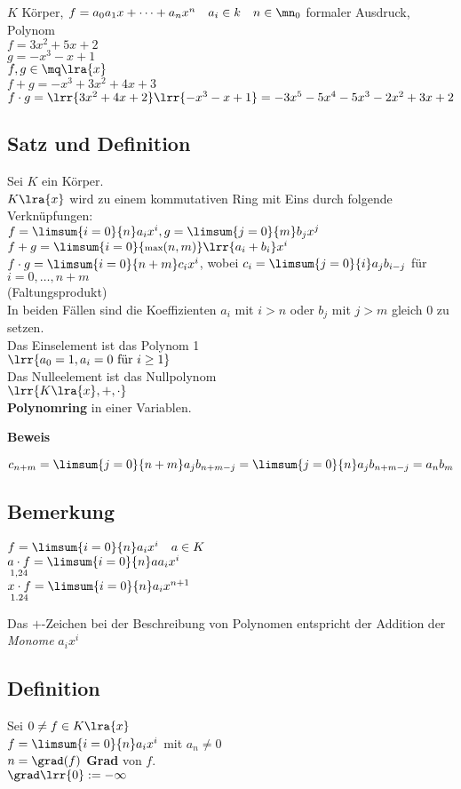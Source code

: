 	$K$ Körper, $f=a_0a_1x+\dots+a_nx^n\quad a_i\in k\quad n\in\mn_0$ formaler Ausdruck, Polynom\\
	$f=3x^2+5x+2$\\
	$g=-x^3-x+1$\\
	$f,g\in\mq\lra{x}$\\
	$f+g=-x^3+3x^2+4x+3$\\
	$f\cdot g=\lrr{3x^2+4x+2}\lrr{-x^3-x+1}=-3x^5-5x^4-5x^3-2x^2+3x+2$
\subsection{Satz und Definition}
	Sei $K$ ein Körper.\\
	$K\lra{x}$ wird zu einem kommutativen Ring mit Eins durch folgende Verknüpfungen:\\
	$f=\limsum{i=0}{n}a_ix^i, g=\limsum{j=0}{m}b_jx^j$\\
	$f+g = \limsum{i=0}{\mbox{\scriptsize max}(n,m)}\lrr{a_i+b_i}x^i$\\
	$f\cdot g= \limsum{i=0}{n+m} c_ix^i$, wobei $c_i=\limsum{j=0}{i}a_jb_{i-j}$ für $i=0,\dots,n+m$\\
	(Faltungsprodukt)\\
	In beiden Fällen sind die Koeffizienten $a_i$ mit $i>n$ oder $b_j$ mit $j>m$ gleich $0$ zu setzen.\\
	Das Einselement ist das Polynom 1\\
	$\lrr{a_0=1,a_i=0\mbox{ für }i\geq 1}$\\
	Das Nulleelement ist das Nullpolynom\\
	$\lrr{K\lra{x},+,\cdot}$\\
	\textbf{Polynomring} in einer Variablen.
	
	\textbf{Beweis}
	
	$c_{n+m}=\limsum{j=0}{n+m}a_jb_{n+m-j}=\limsum{j=0}{n}a_jb_{n+m-j}=a_nb_m$
\subsection{Bemerkung}
		\item $f=\limsum{i=0}{n}a_ix^i\quad a\in K$\\
			$\underset{1,24}{a\cdot f} =\limsum{i=0}{n}aa_ix^i$\\
			$\underset{1.24}{x\cdot f} =\limsum{i=0}{n}a_ix^{n+1}$
		\item Das $+$-Zeichen bei der Beschreibung von Polynomen entspricht der Addition der \textit{Monome} $a_ix^i$
	\subExEnd
\subsection{Definition}
	Sei $0\neq f\in K\lra{x}$\\
	$f=\limsum{i=0}{n}a_ix^i$ mit $a_n\neq 0$\\
	$n=\grad(f)$ \textbf{Grad} von $f$.\\
	$\grad\lrr{0}:=-\infty$

